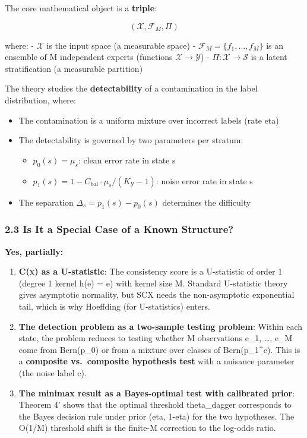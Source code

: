 \documentclass[
  12pt,
]{ctexart}
\providecommand{\tightlist}{%
  \setlength{\itemsep}{0pt}\setlength{\parskip}{0pt}}
\begin{document}
The core mathematical object is a \textbf{triple}:

\[(\mathcal{X}, \mathcal{F}_M, \Pi)\]

where: - \(\mathcal{X}\) is the input space (a measurable space) -
\(\mathcal{F}_M = \{f_1, \dots, f_M\}\) is an ensemble of M independent
experts (functions \(\mathcal{X} \to \mathcal{Y}\)) -
\(\Pi: \mathcal{X} \to \mathcal{S}\) is a latent stratification (a
measurable partition)

The theory studies the \textbf{detectability} of a contamination in the
label distribution, where:

\begin{itemize}
\tightlist
\item
  The contamination is a uniform mixture over incorrect labels (rate
  eta)
\item
  The detectability is governed by two parameters per stratum:

  \begin{itemize}
  \tightlist
  \item
    \(p_0(s) = \mu_s\): clean error rate in state s
  \item
    \(p_1(s) = 1 - C_{\text{bal}}\cdot\mu_s/(K_{\mathcal{Y}}-1)\): noise
    error rate in state s
  \end{itemize}
\item
  The separation \(\Delta_s = p_1(s) - p_0(s)\) determines the
  difficulty
\end{itemize}

\subsubsection{2.3 Is It a Special Case of a Known
Structure?}\label{is-it-a-special-case-of-a-known-structure}

\textbf{Yes, partially:}

\begin{enumerate}
\def\labelenumi{\arabic{enumi}.}
\item
  \textbf{C(x) as a U-statistic}: The consistency score is a U-statistic
  of order 1 (degree 1 kernel h(e) = e) with kernel size M. Standard
  U-statistic theory gives asymptotic normality, but SCX needs the
  non-asymptotic exponential tail, which is why Hoeffding (for
  U-statistics) enters.
\item
  \textbf{The detection problem as a two-sample testing problem}: Within
  each state, the problem reduces to testing whether M observations
  e\_1, \ldots, e\_M come from Bern(p\_0) or from a mixture over classes
  of Bern(p\_1\^{}c). This is a \textbf{composite vs.~composite
  hypothesis test} with a nuisance parameter (the noise label c).
\item
  \textbf{The minimax result as a Bayes-optimal test with calibrated
  prior}: Theorem 4' shows that the optimal threshold theta\_dagger
  corresponds to the Bayes decision rule under prior (eta, 1-eta) for
  the two hypotheses. The O(1/M) threshold shift is the finite-M
  correction to the log-odds ratio.
\end{enumerate}
\end{document}
